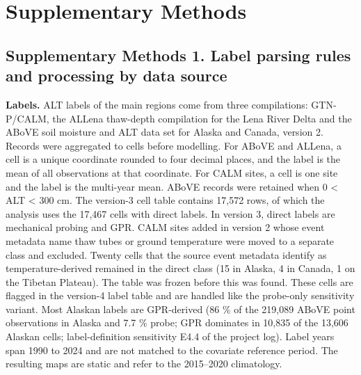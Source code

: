 
\section*{Supplementary Methods}

\subsection*{Supplementary Methods 1. Label parsing rules and processing by data source}

\textbf{Labels.} ALT labels of the main regions come from three compilations: GTN-P/CALM\cite{Streletskiy2025}, the ALLena thaw-depth compilation for the Lena River Delta\cite{Veremeeva2025} and the ABoVE soil moisture and ALT data set for Alaska and Canada, version 2\cite{Moore2025}. Records were aggregated to cells before modelling. For ABoVE and ALLena, a cell is a unique coordinate rounded to four decimal places, and the label is the mean of all observations at that coordinate. For CALM sites, a cell is one site and the label is the multi-year mean. ABoVE records were retained when 0 < ALT < 300 cm. The version-3 cell table contains 17,572 rows, of which the analysis uses the 17,467 cells with direct labels. In version 3, direct labels are mechanical probing and GPR. CALM sites added in version 2 whose event metadata name thaw tubes or ground temperature were moved to a separate class and excluded. Twenty cells that the source event metadata identify as temperature-derived remained in the direct class (15 in Alaska, 4 in Canada, 1 on the Tibetan Plateau). The table was frozen before this was found. These cells are flagged in the version-4 label table and are handled like the probe-only sensitivity variant. Most Alaskan labels are GPR-derived (86 \% of the 219,089 ABoVE point observations in Alaska and 7.7 \% probe; GPR dominates in 10,835 of the 13,606 Alaskan cells; label-definition sensitivity E4.4 of the project log). Label years span 1990 to 2024 and are not matched to the covariate reference period. The resulting maps are static and refer to the 2015–2020 climatology.

